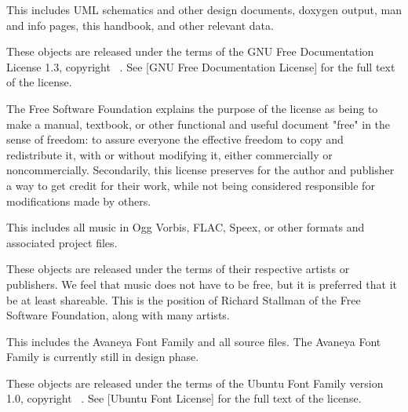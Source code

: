 
This includes UML schematics and other design documents, doxygen output, man and info pages, this handbook, and other relevant data.

These objects are released under the terms of the GNU Free Documentation License 1.3, copyright \CopyrightDates\ \CopyrightHolder. See [GNU Free Documentation License] for the full text of the license.

The Free Software Foundation explains the purpose of the license as being to make a manual, textbook, or other functional and useful document "free" in the sense of freedom: to assure everyone the effective freedom to copy and redistribute it, with or without modifying it, either commercially or noncommercially. Secondarily, this license preserves for the author and publisher a way to get credit for their work, while not being considered responsible for modifications made by others.


This includes all music in Ogg Vorbis, FLAC, Speex, or other formats and associated project files.

These objects are released under the terms of their respective artists or publishers. We feel that music does not have to be free, but it is preferred that it be at least shareable. This is the position of Richard Stallman of the Free Software Foundation, along with many artists.


This includes the Avaneya Font Family and all source files. The Avaneya Font Family is currently still in design phase.

These objects are released under the terms of the Ubuntu Font Family version 1.0, copyright \CopyrightDates\ \CopyrightHolder. See [Ubuntu Font License] for the full text of the license.
\stopitemize

\StopChapter

